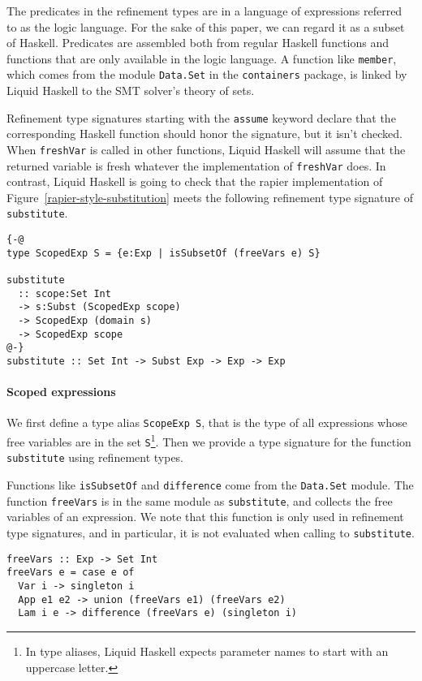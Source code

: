 \documentclass[sigconf, anonymous, review]{acmart}
\newcommand{\tc}[1]{{\small\texttt{#1}}}
\begin{document}
The predicates in the refinement types are in a language of expressions
referred to as the logic language. For the sake of this paper, we can
regard it as a subset of Haskell. Predicates are assembled both from
regular Haskell functions and functions that are
only available in the logic language.
A function like \tc{member}, which comes from the module \tc{Data.Set}
in the \tc{containers} package, is linked by Liquid Haskell to the
SMT solver's theory of sets.

Refinement type signatures starting with the \tc{assume} keyword declare that the
corresponding Haskell function should honor the signature, but it isn't
checked. When \tc{freshVar} is called in other functions, Liquid Haskell
will assume that the returned variable is fresh whatever the implementation
of \tc{freshVar} does. In contrast, Liquid Haskell is going to check that
the rapier implementation of Figure~\ref{rapier-style-substitution} meets the
following refinement type signature of \tc{substitute}.

\begin{verbatim}
{-@
type ScopedExp S = {e:Exp | isSubsetOf (freeVars e) S}

substitute
  :: scope:Set Int
  -> s:Subst (ScopedExp scope)
  -> ScopedExp (domain s)
  -> ScopedExp scope
@-}
substitute :: Set Int -> Subst Exp -> Exp -> Exp
\end{verbatim}
\paragraph{Scoped expressions}
We first define a type alias \tc{ScopeExp S}, that is the type of all
expressions whose free variables are in the set \tc{S}\footnote{In type aliases,
Liquid Haskell expects parameter names to start with an uppercase letter.}.
Then we provide a type signature for the function \tc{substitute} using
refinement types.

Functions like \tc{isSubsetOf} and \tc{difference} come from the \tc{Data.\allowbreak Set}
module. The function \tc{freeVars} is in the same module as \tc{subs\-ti\-tute},
and collects the free variables of an expression. We note that this function
is only used in refinement type signatures, and in particular, it is not evaluated
when calling to \tc{substitute}.

\begin{verbatim}
freeVars :: Exp -> Set Int
freeVars e = case e of
  Var i -> singleton i
  App e1 e2 -> union (freeVars e1) (freeVars e2)
  Lam i e -> difference (freeVars e) (singleton i)
\end{verbatim}
\end{document}
